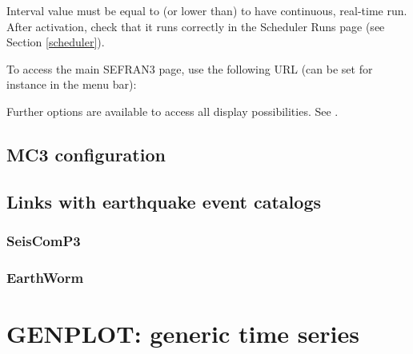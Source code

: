 Interval value must be equal to (or lower than)  to have continuous, real-time run. After activation, check that it runs correctly in the Scheduler Runs page (see Section \ref{scheduler}).

To access the main SEFRAN3 page, use the following URL (can be set for instance in the menu bar):


Further options are available to access all display possibilities. See .


\subsection{MC3 configuration}





%






\subsection{Links with earthquake event catalogs}

\subsubsection{SeisComP3}

\subsubsection{EarthWorm}



\newpage
\section{GENPLOT: generic time series}
\label{genplot}


